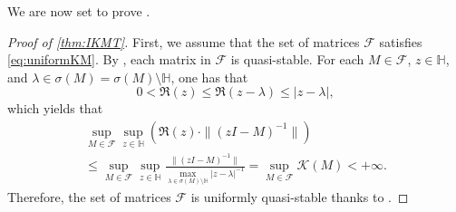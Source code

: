\documentclass{article}
\theoremstyle{plain}%
\theoremstyle{definition}%
\theoremstyle{remark}%
\newcommand{\bH}{\mathbb{H}}
\newcommand{\cF}{\mathcal{F}}
\newcommand{\cK}{\mathcal{K}}
\newcommand{\+}[1]{{\bm{#1}}}
\newcommand{\norm}[1]{\|{#1}\|}
\begin{document}
We are now set to prove .
\begin{proof}[Proof of \cref{thm:IKMT}]
  First, we assume that the set of matrices $\cF$ satisfies 
  \cref{eq:uniformKM}. By , each matrix in $\cF$ 
  is quasi-stable. For each $M \in \cF$, $z \in \bH$, and 
  $\lambda \in \sigma(M) = \sigma(M) \setminus \bH$, one has that 
  \begin{displaymath}
    0 < \Re(z) \le \Re(z - \lambda) \le |z - \lambda|,
  \end{displaymath}
  which yields that 
  \begin{multline*}
    \sup_{M \in \cF} \sup_{z \in \bH} \left( \Re(z) \cdot 
    \norm{(z I - M)^{-1}} \right) \\ \le \sup_{M \in \cF} 
    \sup_{z \in \bH} \frac{\norm{(z I - M)^{-1}}}
    {\max_{\lambda \in \sigma(M) \setminus \bH} |z - \lambda|^{-1}}
    = \sup_{M \in \cF} \cK(M) < + \infty.
  \end{multline*}
  Therefore, the set of matrices $\cF$ is uniformly quasi-stable 
  thanks to .


\end{proof}
\end{document}
